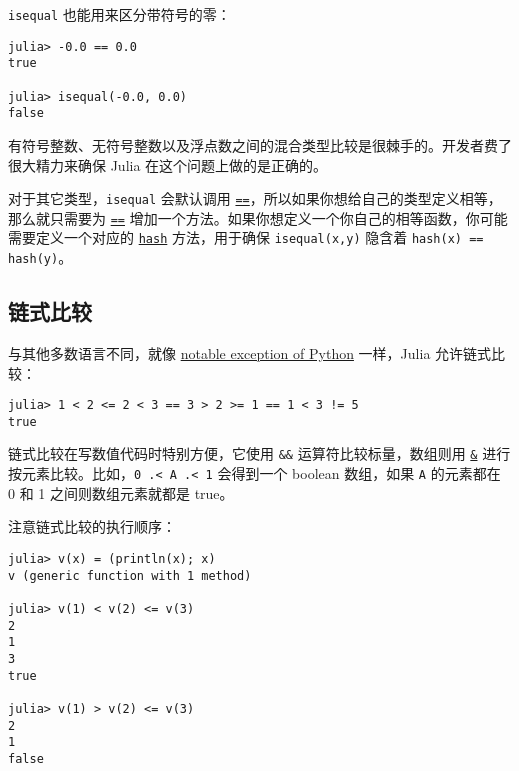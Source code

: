 \texttt{isequal} 也能用来区分带符号的零：




\begin{verbatim}
julia> -0.0 == 0.0
true

julia> isequal(-0.0, 0.0)
false
\end{verbatim}



有符号整数、无符号整数以及浮点数之间的混合类型比较是很棘手的。开发者费了很大精力来确保 Julia 在这个问题上做的是正确的。



对于其它类型，\texttt{isequal} 会默认调用 \hyperlink{15143149452920304570}{\texttt{==}}，所以如果你想给自己的类型定义相等，那么就只需要为 \hyperlink{15143149452920304570}{\texttt{==}} 增加一个方法。如果你想定义一个你自己的相等函数，你可能需要定义一个对应的 \hyperlink{13797072367283572032}{\texttt{hash}} 方法，用于确保 \texttt{isequal(x,y)} 隐含着 \texttt{hash(x) == hash(y)}。



\hypertarget{9107485161550737856}{}


\subsection{链式比较}



与其他多数语言不同，就像 \href{https://en.wikipedia.org/wiki/Python\_syntax\_and\_semantics\#Comparison\_operators}{notable exception of Python} 一样，Julia 允许链式比较：




\begin{verbatim}
julia> 1 < 2 <= 2 < 3 == 3 > 2 >= 1 == 1 < 3 != 5
true
\end{verbatim}



链式比较在写数值代码时特别方便，它使用 \texttt{\&\&} 运算符比较标量，数组则用 \hyperlink{1494761116451616317}{\texttt{\&}} 进行按元素比较。比如，\texttt{0 .< A .< 1} 会得到一个 boolean 数组，如果 \texttt{A} 的元素都在 0 和 1 之间则数组元素就都是 true。



注意链式比较的执行顺序：




\begin{verbatim}
julia> v(x) = (println(x); x)
v (generic function with 1 method)

julia> v(1) < v(2) <= v(3)
2
1
3
true

julia> v(1) > v(2) <= v(3)
2
1
false
\end{verbatim}



